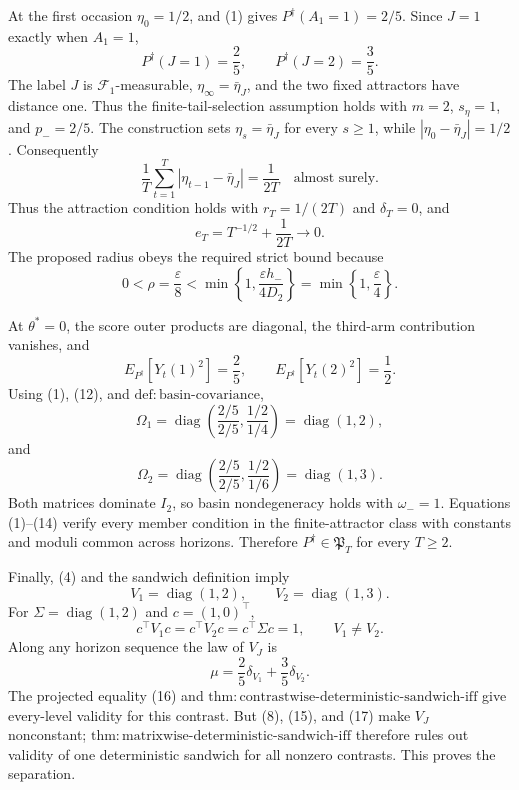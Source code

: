 At the first occasion \(\eta_0=1/2\), and (1) gives \(P^{\dagger}(A_1=1)=2/5\). Since \(J=1\) exactly when \(A_1=1\),
\[
 P^{\dagger}(J=1)=\frac25,
 \qquad P^{\dagger}(J=2)=\frac35. \tag{8}
\]
The label \(J\) is \(\mathcal F_1\)-measurable, \(\eta_\infty=\bar\eta_J\), and the two fixed attractors have distance one. Thus the finite-tail-selection assumption holds with \(m=2\), \(s_\eta=1\), and \(p_-=2/5\). The construction sets \(\eta_s=\bar\eta_J\) for every \(s\ge1\), while \(|\eta_0-\bar\eta_J|=1/2\). Consequently
\[
 \frac1T\sum_{t=1}^T|\eta_{t-1}-\bar\eta_J|=\frac1{2T}
 \quad\text{almost surely}. \tag{9}
\]
Thus the attraction condition holds with \(r_T=1/(2T)\) and \(\delta_T=0\), and
\[
 e_T=T^{-1/2}+\frac1{2T}\longrightarrow0. \tag{10}
\]
The proposed radius obeys the required strict bound because
\[
 0<\rho=\frac\varepsilon8
 <\min\left\{1,\frac{\varepsilon h_-}{4D_2}\right\}
 =\min\left\{1,\frac\varepsilon4\right\}. \tag{11}
\]

At \(\theta^*=0\), the score outer products are diagonal, the third-arm contribution vanishes, and
\[
 E_{P^{\dagger}}[Y_t(1)^2]=\frac25,
 \qquad E_{P^{\dagger}}[Y_t(2)^2]=\frac12. \tag{12}
\]
Using (1), (12), and \(\mathrm{def:basin\text{-}covariance}\),
\[
 \Omega_1=\operatorname{diag}\left(\frac{2/5}{2/5},\frac{1/2}{1/4}\right)
 =\operatorname{diag}(1,2), \tag{13}
\]
and
\[
 \Omega_2=\operatorname{diag}\left(\frac{2/5}{2/5},\frac{1/2}{1/6}\right)
 =\operatorname{diag}(1,3). \tag{14}
\]
Both matrices dominate \(I_2\), so basin nondegeneracy holds with \(\omega_-=1\). Equations (1)--(14) verify every member condition in the finite-attractor class with constants and moduli common across horizons. Therefore \(P^{\dagger}\in\mathfrak P_T\) for every \(T\ge2\).

Finally, (4) and the sandwich definition imply
\[
 V_1=\operatorname{diag}(1,2),
 \qquad V_2=\operatorname{diag}(1,3). \tag{15}
\]
For \(\Sigma=\operatorname{diag}(1,2)\) and \(c=(1,0)^\top\),
\[
 c^\top V_1c=c^\top V_2c=c^\top\Sigma c=1,
 \qquad V_1\ne V_2. \tag{16}
\]
Along any horizon sequence the law of \(V_J\) is
\[
 \mu=\frac25\delta_{V_1}+\frac35\delta_{V_2}. \tag{17}
\]
The projected equality (16) and \(\mathrm{thm:contrastwise\text{-}deterministic\text{-}sandwich\text{-}iff}\) give every-level validity for this contrast. But (8), (15), and (17) make \(V_J\) nonconstant; \(\mathrm{thm:matrixwise\text{-}deterministic\text{-}sandwich\text{-}iff}\) therefore rules out validity of one deterministic sandwich for all nonzero contrasts. This proves the separation.